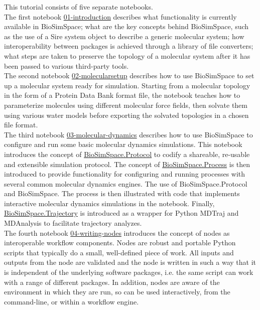 This tutorial consists of five separate notebooks. 
\\
The first notebook \href{https://github.com/OpenBioSim/BioSimSpaceTutorials/blob/main/01_introduction/01_introduction.ipynb}{01-introduction} describes what functionality is currently available in BioSimSpace; what are the key concepts behind BioSimSpace, such as the use of a Sire system object to describe a generic molecular system; how interoperability between packages is achieved through a library of file converters;  what steps are taken to preserve the topology of a molecular system after it has been passed to various third-party tools. 
\\
%
The second notebook \href{https://github.com/OpenBioSim/BioSimSpaceTutorials/blob/main/01_introduction/02_molecular_setup.ipynb}{02-molecularsetup} 
describes how to use BioSimSpace to set up a molecular system ready for simulation. Starting from a molecular topology in the form of a Protein Data Bank format file, the notebook teaches how to parameterize molecules using different molecular force fields, then solvate them using various water models before exporting the solvated topologies in a chosen file format. 
\\
%
The third notebook \href{https://github.com/OpenBioSim/BioSimSpaceTutorials/blob/main/01_introduction/03_molecular_dynamics.ipynb}{03-molecular-dynamics} describes how to use BioSimSpace to configure and run some basic molecular dynamics simulations. This notebook introduces the concept of \href{https://biosimspace.org/api/index_Protocol.html}{BioSimSpace.Protocol} to codify a shareable, re-usable and extensible simulation protocol. The concept of \href{https://biosimspace.org/api/index_Process.html}{BioSimSpace.Process}
is then introduced to provide functionality for configuring and running processes with several common molecular dynamics engines. The use of BioSimSpace.Protocol and BioSimSpace. The process is then illustrated with code that implements interactive molecular dynamics simulations in the notebook. Finally, \href{https://biosimspace.openbiosim.org/api/index_Trajectory.html}{BioSimSpace.Trajectory} is introduced as a wrapper for Python MDTraj and MDAnalysis to facilitate trajectory analyzes. 
\\
%
The fourth notebook \href{https://github.com/OpenBioSim/BioSimSpaceTutorials/blob/main/01_introduction/04_writing_nodes.ipynb}{04-writing-nodes} introduces the concept of nodes as interoperable workflow components. Nodes are robust and portable Python scripts that typically do a small, well-defined piece of work. All inputs and outputs from the node are validated and the node is written in such a way that it is independent of the underlying software packages, i.e. the same script can work with a range of different packages. In addition, nodes are aware of the environment in which they are run, so can be used interactively, from the command-line, or within a workflow engine. 
